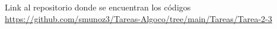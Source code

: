 Link al repositorio donde se encuentran los códigos \url{https://github.com/smunoz3/Tareas-Algoco/tree/main/Tareas/Tarea-2-3}
